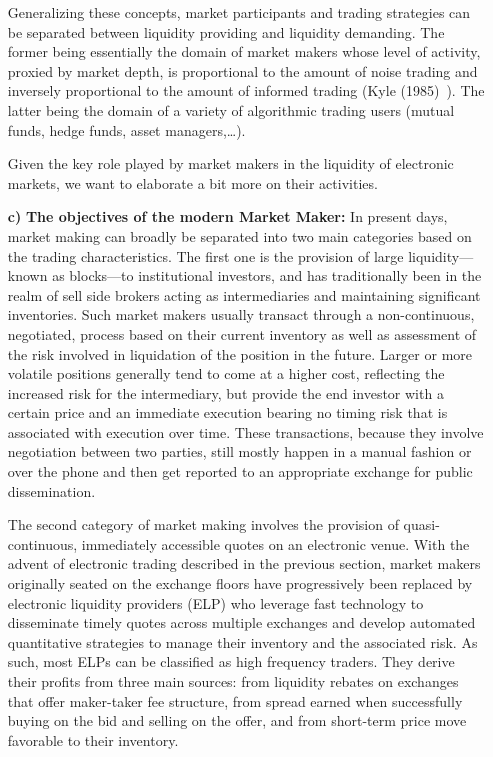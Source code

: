 \begin{enumerate}
Generalizing these concepts, market participants and trading strategies can be separated between liquidity providing and liquidity demanding. The former being essentially the domain of market makers whose level of activity, proxied by market depth, is proportional to the amount of noise trading and inversely proportional to the amount of informed trading (Kyle (1985)~\cite{kyle1985}). The latter being the domain of a variety of algorithmic trading users (mutual funds, hedge funds, asset managers,\dots).


Given the key role played by market makers in the liquidity of electronic markets, we want to elaborate a bit more on their activities.

\item[\textbf{c)}] \textbf{The objectives of the modern Market Maker:}
In present days, market making can broadly be separated into two main categories based on the trading characteristics. The first one is the provision of large liquidity---known as blocks---to institutional investors, and has traditionally been in the realm of sell side brokers acting as intermediaries and maintaining significant inventories. Such market makers usually transact through a non-continuous, negotiated, process based on their current inventory as well as assessment of the risk involved in liquidation of the position in the future. Larger or more volatile positions generally tend to come at a higher cost, reflecting the increased risk for the intermediary, but provide the end investor with a certain price and an immediate execution bearing no timing risk that is associated with execution over time. These transactions, because they involve negotiation between two parties, still mostly happen in a manual fashion or over the phone and then get reported to an appropriate exchange for public dissemination.


The second category of market making involves the provision of quasi-continuous, immediately accessible quotes on an electronic venue. With the advent of electronic trading described in the previous section, market makers originally seated on the exchange floors have progressively been replaced by electronic liquidity providers (ELP) who leverage fast technology to disseminate timely quotes across multiple exchanges and develop automated quantitative strategies to manage their inventory and the associated risk. As such, most ELPs can be classified as high frequency traders. They derive their profits from three main sources: from liquidity rebates on exchanges that offer maker-taker fee structure, from spread earned when successfully buying on the bid and selling on the offer, and from short-term price move favorable to their inventory. 



\end{enumerate}
